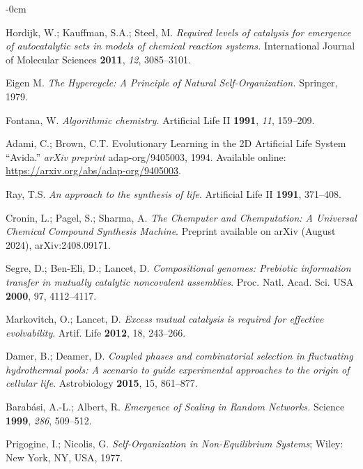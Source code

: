 \documentclass[life,article,submit,pdftex,moreauthors]{Definitions/mdpi}
\begin{document}
\begin{adjustwidth}{-\extralength}{0cm}
{\begin{thebibliography}{999}
Hordijk, W.; Kauffman, S.A.; Steel, M. \textit{Required levels of catalysis for emergence of autocatalytic sets in models of chemical reaction systems.} International Journal of Molecular Sciences \textbf{2011}, \textit{12}, 3085–3101.

Eigen M. \textit{The Hypercycle: A Principle of Natural Self-Organization.} Springer, 1979.

Fontana, W. \textit{Algorithmic chemistry.} Artificial Life II \textbf{1991}, \textit{11}, 159–209.

Adami, C.; Brown, C.T. 
Evolutionary Learning in the 2D Artificial Life System ``Avida.'' 
\textit{arXiv preprint} adap-org/9405003, 1994. Available online: \url{https://arxiv.org/abs/adap-org/9405003}.

Ray, T.S. \textit{An approach to the synthesis of life}. Artificial Life II \textbf{1991}, 371--408.

Cronin, L.; Pagel, S.; Sharma, A. \textit{The Chemputer and Chemputation: A Universal Chemical Compound Synthesis Machine}. Preprint available on arXiv (August 2024), arXiv:2408.09171.

Segre, D.; Ben-Eli, D.; Lancet, D. \textit{Compositional genomes: Prebiotic information transfer in mutually catalytic noncovalent assemblies}. Proc. Natl. Acad. Sci. USA \textbf{2000}, 97, 4112--4117.

Markovitch, O.; Lancet, D. \textit{Excess mutual catalysis is required for effective evolvability}. Artif. Life \textbf{2012}, 18, 243--266.

Damer, B.; Deamer, D. \textit{Coupled phases and combinatorial selection in fluctuating hydrothermal pools: A scenario to guide experimental approaches to the origin of cellular life}. Astrobiology \textbf{2015}, 15, 861--877.

Barabási, A.-L.; Albert, R. \textit{Emergence of Scaling in Random Networks.} Science \textbf{1999}, \textit{286}, 509–512.

Prigogine, I.; Nicolis, G. \textit{Self-Organization in Non-Equilibrium Systems}; Wiley: New York, NY, USA, 1977.


\end{thebibliography}}
\end{adjustwidth}
\end{document}
